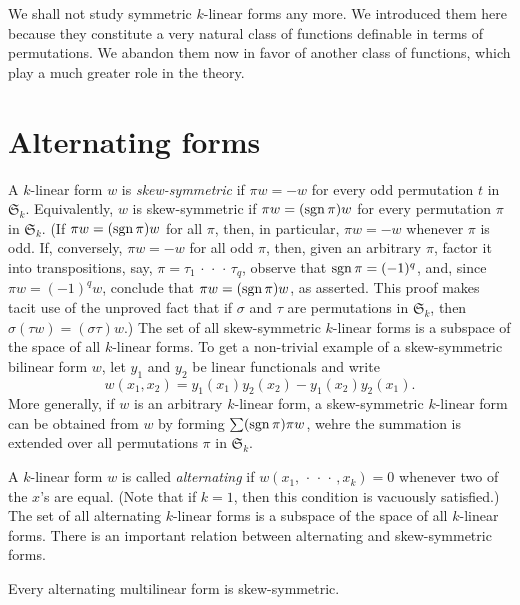 We shall not study symmetric \(k\)-linear forms any more. We introduced them here because they constitute a very natural class of functions definable in terms of permutations. We abandon them now in favor of another class of functions, which play a much greater role in the theory.

\section{Alternating forms}

A \(k\)-linear form \(w\) is \emph{skew-symmetric} if \(\pi w =-w\) for every
odd permutation \(t\) in \(\mathfrak{S}_k\). Equivalently, \(w\) is
skew-symmetric if \(\pi w=(\operatorname{sgn} \pi)w\) for every permutation \(\pi\) in
\(\mathfrak{S}_k\). (If \(\pi w=(\operatorname{sgn} \pi)w\) for all \(\pi\), then, in
particular, \(\pi w = -w\) whenever \(\pi\) is odd. If, conversely, \(\pi w=-w\)
for all odd \(\pi\), then, given an arbitrary \(\pi\), factor it into
transpositions, say, \(\pi = \tau_1\,\cdot\,\cdot\,\cdot\, \tau_q\), observe
that \(\operatorname{sgn} \pi=(-1)^q\), and, since \(\pi w=(-1)^q w\), conclude that \(\pi w
= (\operatorname{sgn} \pi) w\), as asserted. This proof makes tacit use of the unproved fact
that if \(\sigma\) and \(\tau\) are permutations in \(\mathfrak{S}_k\), then
\(\sigma(\tau w) = (\sigma \tau) w\).) The set of all skew-symmetric
\(k\)-linear forms is a subspace of the space of all \(k\)-linear forms. To get
a non-trivial example of a skew-symmetric bilinear form \(w\), let \(y_1\) and
\(y_2\) be linear functionals and write
\begin{equation*}
    w(x_1, x_2) = y_1(x_1) y_2(x_2) - y_1(x_2) y_2(x_1).
\end{equation*}
More generally, if \(w\) is an arbitrary \(k\)-linear form, a skew-symmetric
\(k\)-linear form can be obtained from \(w\) by forming \(\sum (\operatorname{sgn} \pi)\pi
w\), wehre the summation is extended over all permutations \(\pi\) in
\(\mathfrak{S}_k\).

A \(k\)-linear form \(w\) is called \emph{alternating} if \(w(x_1,
\,\cdot\,\cdot\,\cdot\,,x_k)=0\) whenever two of the \(x\)'s are equal. (Note
that if \(k=1\), then this condition is vacuously satisfied.) The set of all
alternating \(k\)-linear forms is a subspace of the space of all \(k\)-linear
forms. There is an important relation between alternating and skew-symmetric
forms.

\begin{theorem}
    Every alternating multilinear form is skew-symmetric.
\end{theorem}




